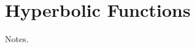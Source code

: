 \documentclass[../main.tex]{subfiles}
\begin{document}
\chapter{Hyperbolic Functions}
Notes.
\end{document}
